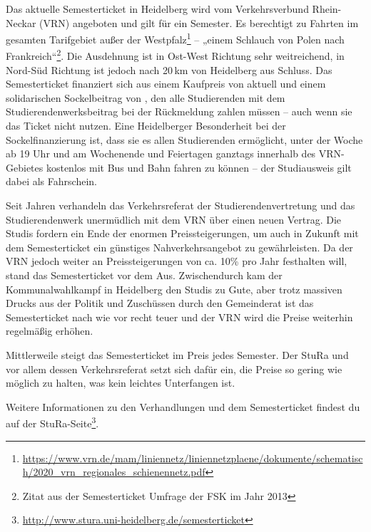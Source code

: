Das aktuelle Semesterticket in Heidelberg wird vom Verkehrsverbund Rhein-Neckar (VRN) angeboten und gilt für ein Semester. Es berechtigt zu Fahrten im gesamten Tarifgebiet außer der Westpfalz\footnote{\url{https://www.vrn.de/mam/liniennetz/liniennetzplaene/dokumente/schematisch/2020_vrn_regionales_schienennetz.pdf}} -- „einem Schlauch von Polen nach Frankreich“\footnote{Zitat aus der Semesterticket Umfrage der FSK im Jahr 2013}. Die Ausdehnung ist in Ost-West Richtung sehr weitreichend, in Nord-Süd Richtung ist jedoch nach 20\,km von Heidelberg aus Schluss. Das Semesterticket finanziert sich aus einem Kaufpreis von aktuell \EUR{\semesterticket} und einem solidarischen Sockelbeitrag von \EUR{\sockelbeitrag}, den alle Studierenden mit dem Studierendenwerksbeitrag bei der Rückmeldung zahlen müssen -- auch wenn sie das Ticket nicht nutzen. Eine Heidelberger Besonderheit bei der Sockelfinanzierung ist, dass sie es allen Studierenden ermöglicht, unter der Woche ab 19 Uhr und am Wochenende und Feiertagen ganztags innerhalb des VRN-Gebietes kostenlos mit Bus und Bahn fahren zu können -- der Studiausweis gilt dabei als Fahrschein.

Seit Jahren verhandeln das Verkehrsreferat der Studierendenvertretung und das Studierendenwerk unermüdlich mit dem VRN über einen neuen Vertrag. Die Studis fordern ein Ende der enormen Preissteigerungen, um auch in Zukunft mit dem Semesterticket ein günstiges Nahverkehrsangebot zu gewährleisten. Da der VRN jedoch weiter an Preissteigerungen von ca. 10\% pro Jahr festhalten will, stand das Semesterticket vor dem Aus. Zwischendurch kam der Kommunalwahlkampf in Heidelberg den Studis zu Gute, aber trotz massiven Drucks aus der Politik und Zuschüssen durch den Gemeinderat ist das Semesterticket nach wie vor recht teuer und der VRN wird die Preise weiterhin regelmäßig erhöhen.

Mittlerweile steigt das Semesterticket im Preis jedes Semester. Der StuRa und vor allem dessen Verkehrsreferat setzt sich dafür ein, die Preise so gering wie möglich zu halten, was kein leichtes Unterfangen ist.

Weitere Informationen zu den Verhandlungen und dem Semesterticket findest du auf der StuRa-Seite\footnote{\url{http://www.stura.uni-heidelberg.de/semesterticket}}.
